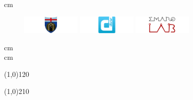 \begin{frame}[plain,c]
	\begin{center}
			 cm
			\begin{figure}[htp]
				  \centering
				  \includegraphics[width=0.25\textwidth]{./figures/logo/unige.pdf}
				  \hskip 0.5cm
				  \includegraphics[width=0.25\textwidth]{./figures/logo/dibris2.pdf}
				  \hskip 0.5cm
				  \includegraphics[width=0.25\textwidth]{./figures/logo/emaroLab.pdf}
			\end{figure}
			 cm
			{\small \theInstitute \\}
			 cm
	\end{center}

	\vfill

	\line(1,0){120}
	\begin{flushleft}\em\textsc{\textbf{\Large\theTitle}}\end{flushleft}
	\begin{center}\em\textsc{\textit{\large\theShortTitle}}\end{center}
	\line(1,0){210}  

	\vfill

	\halfPage{		
	     \begin{flushleft}\theAuthor\end{flushleft}
	}{
	     \begin{flushright}\theCooathor\end{flushright}
	}
	
	\vfill			
	
	\scriptsize\centering
	\centering\theDate\\
	\theConference
\end{frame}
